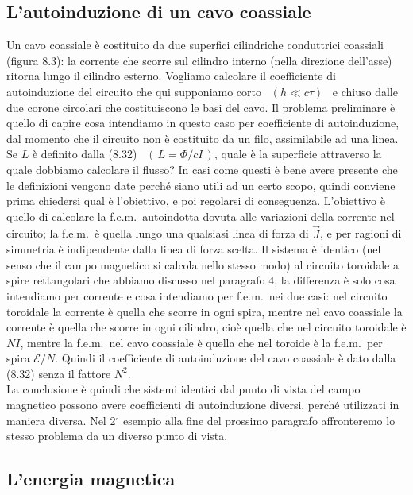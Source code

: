 \subsection{L'autoinduzione di un cavo coassiale}

Un cavo coassiale \`e costituito da due superfici cilindriche conduttrici
coassiali (figura 8.3): la corrente che scorre sul cilindro interno (nella
direzione dell'asse) ritorna lungo il cilindro esterno. Vogliamo calcolare il
coefficiente di autoinduzione del circuito che qui supponiamo corto
\ $(h\ll c\tau)$ \ e chiuso dalle due corone circolari che costituiscono le basi
del cavo.
Il problema preliminare \`e quello di capire cosa intendiamo in questo caso per
coefficiente di autoinduzione, dal momento che il circuito non \`e costituito da
un filo, assimilabile ad una linea. Se $L$ \`e definito dalla (8.32)
\ $(\,L=\Phi/cI\,)$, quale \`e la superficie attraverso la quale dobbiamo
calcolare il flusso? In casi come questi \`e bene avere presente che le
definizioni vengono date perch\'e siano utili ad un certo scopo, quindi conviene
prima chiedersi qual \`e l'obiettivo, e poi regolarsi di conseguenza.
L'obiettivo \`e quello di calcolare la f.e.m.\ autoindotta dovuta alle
variazioni della corrente nel circuito; la f.e.m.\ \`e quella lungo una
qualsiasi linea di forza di $\vec J$, e per ragioni di simmetria \`e
indipendente dalla linea di forza scelta. Il sistema \`e identico (nel senso che
il campo magnetico si calcola nello stesso modo) al circuito toroidale a spire
rettangolari che abbiamo discusso nel paragrafo 4, la differenza \`e solo cosa
intendiamo per corrente e cosa intendiamo per f.e.m.\ nei due casi: nel circuito
toroidale la corrente \`e quella che scorre in ogni spira, mentre nel cavo
coassiale la corrente \`e quella che scorre in ogni cilindro, cio\`e quella che
nel circuito toroidale \`e $NI$, mentre la f.e.m.\ nel cavo coassiale \`e quella
che nel toroide \`e la f.e.m.\ per spira $\mathcal E/N$. Quindi il coefficiente
di autoinduzione del cavo coassiale \`e dato dalla (8.32) senza il fattore
$N^2$.\\
La conclusione \`e quindi che sistemi identici dal punto di vista del campo
magnetico possono avere coefficienti di autoinduzione diversi, perch\'e
utilizzati in maniera diversa. Nel 2$^\circ$ esempio alla fine del prossimo
paragrafo affronteremo lo stesso problema da un diverso punto di vista.

\subsection{L'energia magnetica}


